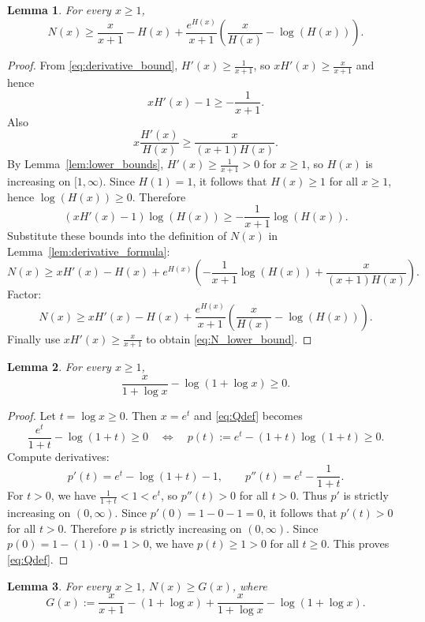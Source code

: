 \documentclass{article}
\newtheorem{lemma}{Lemma}[section]
\begin{document}
\begin{lemma}\label{lem:N_lower_bound}
For every $x\ge 1$,
\begin{equation}\label{eq:N_lower_bound}
N(x)\ge \frac{x}{x+1}-H(x)+\frac{e^{H(x)}}{x+1}\left(\frac{x}{H(x)}-\log(H(x))\right).
\end{equation}
\end{lemma}

\begin{proof}
From \eqref{eq:derivative_bound}, $H'(x)\ge \frac{1}{x+1}$, so $xH'(x)\ge \frac{x}{x+1}$ and hence
\[
xH'(x)-1\ge -\frac{1}{x+1}.
\]
Also
\[
x\frac{H'(x)}{H(x)}\ge \frac{x}{(x+1)H(x)}.
\]
By Lemma~\ref{lem:lower_bounds}, $H'(x) \geq \frac{1}{x+1} > 0$ for $x \geq 1$, so $H(x)$ is increasing on $[1, \infty)$. Since $H(1) = 1$, it follows that $H(x) \geq 1$ for all $x \geq 1$, hence $\log(H(x)) \geq 0$. Therefore
\[
(xH'(x)-1)\log(H(x))\ge -\frac{1}{x+1}\log(H(x)).
\]
Substitute these bounds into the definition of $N(x)$ in Lemma~\ref{lem:derivative_formula}:
\[
N(x)\ge xH'(x)-H(x)+e^{H(x)}\left(-\frac{1}{x+1}\log(H(x))+\frac{x}{(x+1)H(x)}\right).
\]
Factor:
\[
N(x)\ge xH'(x)-H(x)+\frac{e^{H(x)}}{x+1}\left(\frac{x}{H(x)}-\log(H(x))\right).
\]
Finally use $xH'(x)\ge \frac{x}{x+1}$ to obtain \eqref{eq:N_lower_bound}.
\end{proof}

\begin{lemma}\label{lem:Q_positive}
For every $x\ge 1$,
\begin{equation}\label{eq:Qdef}
\frac{x}{1+\log x}-\log(1+\log x)\ge 0.
\end{equation}
\end{lemma}

\begin{proof}
Let $t=\log x\ge 0$. Then $x=e^t$ and \eqref{eq:Qdef} becomes
\[
\frac{e^t}{1+t}-\log(1+t)\ge 0
\quad\Longleftrightarrow\quad
p(t):=e^t-(1+t)\log(1+t)\ge 0.
\]
Compute derivatives:
\[
p'(t)=e^t-\log(1+t)-1,\qquad p''(t)=e^t-\frac{1}{1+t}.
\]
For $t>0$, we have $\frac{1}{1+t}<1<e^t$, so $p''(t)>0$ for all $t>0$.
Thus $p'$ is strictly increasing on $(0,\infty)$. Since $p'(0)=1-0-1=0$, it follows that $p'(t)>0$ for all $t>0$.
Therefore $p$ is strictly increasing on $(0,\infty)$. Since $p(0)=1-(1)\cdot 0=1>0$, we have $p(t)\ge 1>0$ for all $t\ge 0$.
This proves \eqref{eq:Qdef}.
\end{proof}

\begin{lemma}\label{lem:N_ge_G}
For every $x\ge 1$, $N(x)\ge G(x)$, where
\begin{equation}\label{eq:G_lower_bound}
G(x):=\frac{x}{x+1}-(1+\log x)+\frac{x}{1+\log x}-\log(1+\log x).
\end{equation}
\end{lemma}
\end{document}
